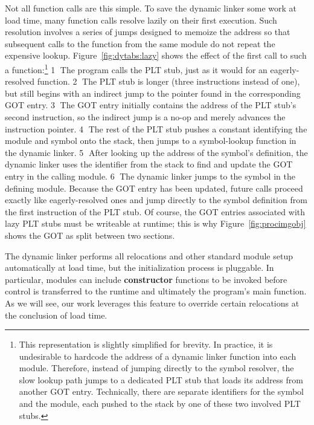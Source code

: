 Not all function calls are this simple.  To save the dynamic linker some work at load
time, many function calls resolve lazily on their first execution.  Such resolution
involves a series of jumps designed to memoize the address so that subsequent calls
to the function from the same module do not repeat the expensive lookup.
Figure~\ref{fig:dytabs:lazy} shows the effect of the first call to such a
function:\footnote{This representation is slightly simplified for brevity.  In
practice, it is undesirable to hardcode the address of a dynamic linker function into
each module.  Therefore, instead of jumping directly to the symbol resolver, the slow
lookup path jumps to a dedicated PLT stub that loads its address from another GOT
entry.  Technically, there are separate identifiers for the symbol and the module,
each pushed to the stack by one of these two involved PLT stubs.}  \textcircled{1}
The program calls the PLT stub, just as it would for an eagerly-resolved function.
\textcircled{2} The PLT stub is longer (three instructions instead of one), but still
begins with an indirect jump to the pointer found in the corresponding GOT entry.
\textcircled{3} The GOT entry initially contains the address of the PLT stub's second
instruction, so the indirect jump is a no-op and merely advances the instruction
pointer.  \textcircled{4} The rest of the PLT stub pushes a constant identifying the
module and symbol onto the stack, then jumps to a symbol-lookup function in the
dynamic linker.  \textcircled{5} After looking up the address of the symbol's
definition, the dynamic linker uses the identifier from the stack to find and update
the GOT entry in the calling module.  \textcircled{6} The dynamic linker jumps to the
symbol in the defining module.  Because the GOT entry has been updated, future calls
proceed exactly like eagerly-resolved ones and jump directly to the symbol definition
from the first instruction of the PLT stub.  Of course, the GOT entries associated
with lazy PLT stubs must be writeable at runtime; this is why
Figure~\ref{fig:procimgobj} shows the GOT as split between two sections.

The dynamic linker performs all relocations and other standard module setup
automatically at load time, but the initialization process is pluggable.  In
particular, modules can include \textbf{constructor} functions to be invoked before
control is transferred to the runtime and ultimately the program's main function.  As
we will see, our work leverages this feature to override certain relocations at the
conclusion of load time.


